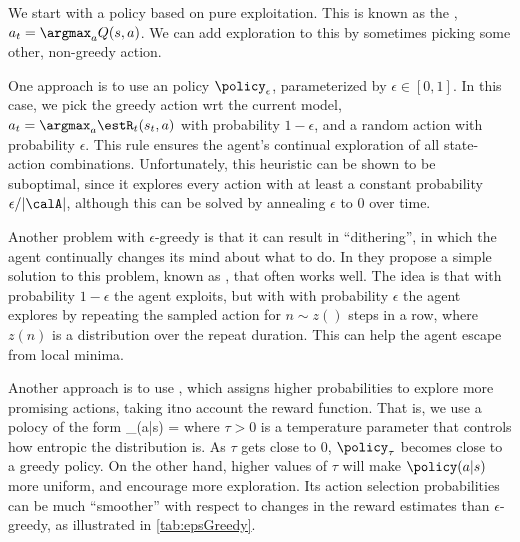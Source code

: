 We start with a policy based on pure exploitation.
This is known as the 
,
$a_t=\argmax_a Q(s,a)$.
We can add exploration to this by 
sometimes picking some other, non-greedy action.

One approach
is to use an
 policy
$\policy_\epsilon$, parameterized by $\epsilon\in[0,1]$. 
In this case,  we pick
the greedy action wrt the current model,
$a_t = \argmax_a \estR_t(s_t,a)$ with probability
$1-\epsilon$, and a random action with probability $\epsilon$.
This rule ensures the agent's continual exploration
of all state-action combinations.
Unfortunately, this heuristic can be shown to be suboptimal,
since it explores every action with at least a constant
probability $\epsilon/|\calA|$,
although this can be solved by annealing $\epsilon$ to 0 over time.


Another problem with $\epsilon$-greedy is that it can result in ``dithering'',
in which the agent continually changes its mind about what to do.
In \citep{Dabney2021} they propose a simple solution to this
problem, known as
,
that often works well.
The idea  is that with probability $1-\epsilon$ the agent
exploits, but with with probability $\epsilon$ the agent
explores by repeating the sampled action for $n \sim z()$ steps
in a row, where $z(n)$ is a distribution over the repeat duration.
This can help the agent escape from local minima.





\label{sec:boltzmannExploration}
Another approach is to use 
,
which assigns higher probabilities to explore more promising actions,
taking itno account the reward function.
That is, we use a polocy of the form
\be
\policy_{\tau}(a|s) = 
\ee
where $\tau>0$ is a temperature parameter
that controls how entropic the distribution is.
As $\tau$ gets close to $0$, $\policy_{\tau}$ becomes close to a greedy policy.  
On the other hand, higher values of $\tau$ will make
$\policy(a|s)$ more uniform, and encourage more exploration.
Its action selection probabilities can be much ``smoother'' with
respect to changes in the reward estimates 
than $\epsilon$-greedy, as illustrated in
\cref{tab:epsGreedy}.

